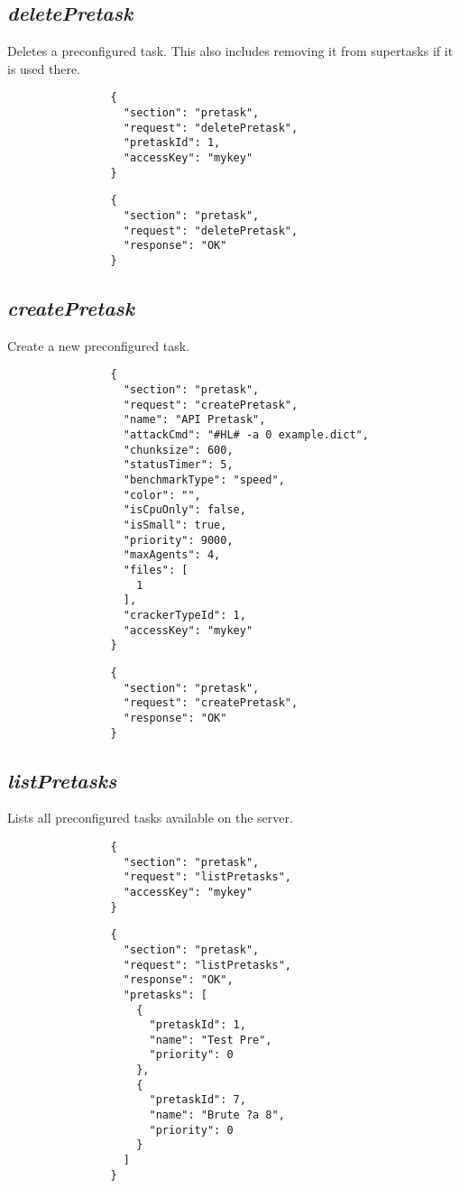 		\subsection*{\textit{deletePretask}}
			Deletes a preconfigured task. This also includes removing it from supertasks if it is used there.
			{
				\color{blue}
				\begin{verbatim}
				{
				  "section": "pretask",
				  "request": "deletePretask",
				  "pretaskId": 1,
				  "accessKey": "mykey"
				}
				\end{verbatim}
			}
			{
				\color{OliveGreen}
				\begin{verbatim}
				{
				  "section": "pretask",
				  "request": "deletePretask",
				  "response": "OK"
				}
				\end{verbatim}
			}
		\subsection*{\textit{createPretask}}
			Create a new preconfigured task.
			{
				\color{blue}
				\begin{verbatim}
				{
				  "section": "pretask",
				  "request": "createPretask",
				  "name": "API Pretask",
				  "attackCmd": "#HL# -a 0 example.dict",
				  "chunksize": 600,
				  "statusTimer": 5,
				  "benchmarkType": "speed",
				  "color": "",
				  "isCpuOnly": false,
				  "isSmall": true,
				  "priority": 9000,
				  "maxAgents": 4,
				  "files": [
				    1
				  ],
				  "crackerTypeId": 1,
				  "accessKey": "mykey"
				}
				\end{verbatim}
			}
			{
				\color{OliveGreen}
				\begin{verbatim}
				{
				  "section": "pretask",
				  "request": "createPretask",
				  "response": "OK"
				}
				\end{verbatim}
			}
		\subsection*{\textit{listPretasks}}
			Lists all preconfigured tasks available on the server.
			{
				\color{blue}
				\begin{verbatim}
				{
				  "section": "pretask",
				  "request": "listPretasks",
				  "accessKey": "mykey"
				}
				\end{verbatim}
			}
			{
				\color{OliveGreen}
				\begin{verbatim}
				{
				  "section": "pretask",
				  "request": "listPretasks",
				  "response": "OK",
				  "pretasks": [
				    {
				      "pretaskId": 1,
				      "name": "Test Pre",
				      "priority": 0
				    },
				    {
				      "pretaskId": 7,
				      "name": "Brute ?a 8",
				      "priority": 0
				    }
				  ]
				}
				\end{verbatim}
			}
